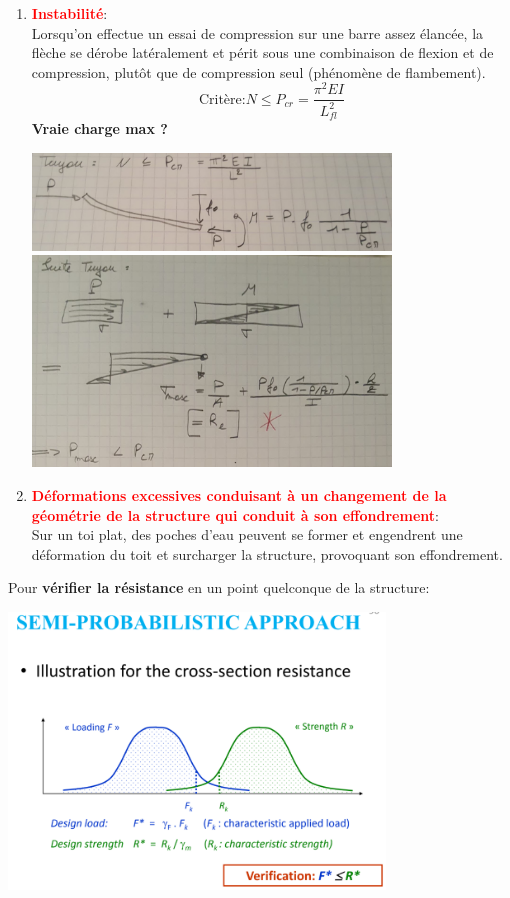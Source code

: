 \documentclass[a4paper]{article}
\begin{document}
\begin{enumerate}[label=(\alph*)]
\item \textcolor{red}{\textbf{Instabilité}}: \\
Lorsqu'on effectue un essai de compression sur une barre assez élancée, la flèche se dérobe latéralement et périt sous une combinaison de flexion et de compression, plutôt que de compression seul (phénomène de flambement).
\[ \text{Critère:} N \leq P_{cr} = \frac{\pi^2 E I}{L_{fl}^2} \]
\textbf{Vraie charge max ?}
\begin{center}
\includegraphics[width=0.75\textwidth]{images/tuyau01.PNG}
\includegraphics[width=0.75\textwidth]{images/tuyau02.PNG}
\end{center}

\item \textcolor{red}{\textbf{Déformations excessives conduisant à un changement de la géométrie de la structure qui conduit à son effondrement}}: \\
Sur un toi plat, des poches d'eau peuvent se former et engendrent une déformation du toit et surcharger la structure, provoquant son effondrement.

\end{enumerate}



Pour \textbf{vérifier la résistance} en un point quelconque de la structure:
\begin{center}
\includegraphics[width=0.75\textwidth]{images/semiprobabilisticResistance.PNG}
\end{center}
\end{document}
